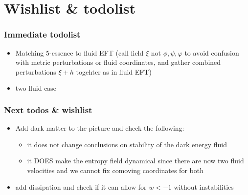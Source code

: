 \section{Wishlist \& todolist}


\subsubsection*{Immediate todolist}
\begin{itemize} 
    \item Matching 5-essence to fluid EFT (call field $\xi$ not $\phi,\psi,\varphi$ to avoid confusion with metric perturbations or fluid coordinates, and gather combined perturbations $\xi+h$ togehter as in fluid EFT)
    \item two fluid case
\end{itemize}   

\subsubsection*{Next todos \& wishlist}
\begin{itemize}
    \item Add dark matter to the picture and check the following:
    \begin{itemize}
        \item it does not change conclusions on stability of the dark energy fluid
        \item it DOES make the entropy field dynamical since there are now two fluid velocities and we cannot fix comoving coordinates for both
    \end{itemize}
    \item add dissipation and check if it can allow for $w<-1$ without instabilities
\end{itemize}